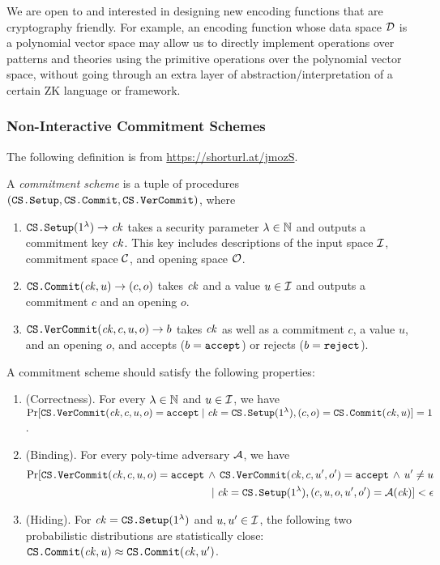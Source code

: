 \documentclass{article}
\begin{document}
We are open to and interested in designing
new encoding functions that are cryptography friendly.
For example, an encoding function whose data space $\mathcal{D}$
is a polynomial vector space may allow
us to directly implement
operations over patterns and theories
using the primitive operations over the polynomial vector space,
without going through an extra layer of abstraction/interpretation
of a certain ZK language or framework.

\subsubsection{Non-Interactive Commitment Schemes}

The following definition is from \url{https://shorturl.at/jmozS}.

\begin{definition}
A \emph{commitment scheme} is a tuple of procedures
$(\textnormal{\texttt{CS.Setup}}, \textnormal{\texttt{CS.Commit}}, \textnormal{\texttt{CS.VerCommit}})$, where
\begin{enumerate}
\item $\textnormal{\texttt{CS.Setup}}(1^\lambda) \to \mathit{ck}$
      takes a security parameter $\lambda \in \mathbb{N}$
      and outputs a commitment key $\mathit{ck}$. This key includes descriptions of
      the input space
      $\mathcal{I}$,  commitment space $\mathcal{C}$, and opening space $\mathcal{O}$.
\item $\textnormal{\texttt{CS.Commit}}(\mathit{ck}, u) \to  (c, o)$ takes $\mathit{ck}$ and a value $u \in \mathcal{I}$
      and outputs a commitment $c$ and an opening $o$.
\item $\textnormal{\texttt{CS.VerCommit}}(\mathit{ck}, c, u, o) \to b$ takes $\mathit{ck}$ as well as
      a commitment $c$, a value $u$, and an opening $o$,
      and accepts ($b = \textnormal{\texttt{accept}}$) or rejects ($b = \textnormal{\texttt{reject}}$).
\end{enumerate}
A commitment scheme should satisfy the following properties:
\begin{enumerate}
\item (Correctness).
      For every $\lambda \in \mathbb{N}$ and $u \in \mathcal{I}$, we have
      $\Pr[\textnormal{\texttt{CS.VerCommit}}(\mathit{ck}, c, u, o) = \textnormal{\texttt{accept}} \mid \mathit{ck} = \textnormal{\texttt{CS.Setup}}(1^\lambda), (c,o) = \textnormal{\texttt{CS.Commit}}(\mathit{ck}, u)] = 1$.
\item (Binding).
      For every poly-time adversary $\mathcal{A}$, we have
      \begin{align*}
           \Pr[\textnormal{\texttt{CS.VerCommit}}(\mathit{ck}, c, u, o) = \textnormal{\texttt{accept}} \,\land\,
           \textnormal{\texttt{CS.VerCommit}}(\mathit{ck}, c, u', o') = \textnormal{\texttt{accept}} \,\land\, u' \neq u
           \\ \mid
           \mathit{ck} = \textnormal{\texttt{CS.Setup}}(1^\lambda), (c,u,o,u',o') = \mathcal{A}(\mathit{ck})] < \epsilon
      \end{align*}
\item (Hiding). For $\mathit{ck} = \textnormal{\texttt{CS.Setup}}(1^\lambda)$ and $u,u' \in \mathcal{I}$,
      the following two probabilistic distributions are statistically close:
      $\textnormal{\texttt{CS.Commit}}(\mathit{ck}, u) \approx \textnormal{\texttt{CS.Commit}}(\mathit{ck}, u')$.
\end{enumerate}
\end{definition}
\end{document}
